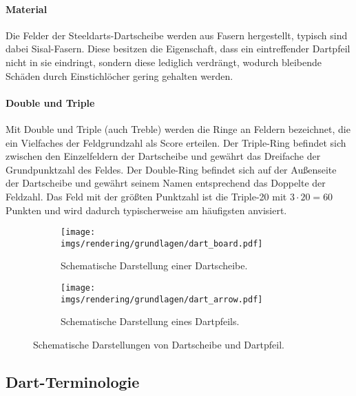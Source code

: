 \paragraph{Material}

Die Felder der Steeldarts-Dartscheibe werden aus Fasern hergestellt, typisch sind dabei Sisal-Fasern. Diese besitzen die Eigenschaft, dass ein eintreffender Dartpfeil nicht in sie eindringt, sondern diese lediglich verdrängt, wodurch bleibende Schäden durch Einstichlöcher gering gehalten werden.

\paragraph{Double und Triple}

Mit Double und Triple (auch Treble) werden die Ringe an Feldern bezeichnet, die ein Vielfaches der Feldgrundzahl als Score erteilen. Der Triple-Ring befindet sich zwischen den Einzelfeldern der Dartscheibe und gewährt das Dreifache der Grundpunktzahl des Feldes. Der Double-Ring befindet sich auf der Außenseite der Dartscheibe und gewährt seinem Namen entsprechend das Doppelte der Feldzahl. Das Feld mit der größten Punktzahl ist die Triple-20 mit $3 \cdot 20 = 60$ Punkten und wird dadurch typischerweise am häufigsten anvisiert.

\begin{figure}
    \begin{subfigure}{\textwidth}
        \centering
        \texttt{[image: imgs/rendering/grundlagen/dart\_board.pdf]}
        \caption{Schematische Darstellung einer Dartscheibe.}
        \label{img:dart_board}
    \end{subfigure}
    \par
    \vspace*{0.5cm}
    \begin{subfigure}{\textwidth}
        \centering
        \texttt{[image: imgs/rendering/grundlagen/dart\_arrow.pdf]}
        \caption{Schematische Darstellung eines Dartpfeils.}
        \label{img:dart_arrow}
    \end{subfigure}
    \caption{Schematische Darstellungen von Dartscheibe und Dartpfeil.}
    \label{img:dart_board_and_arrow}
\end{figure}



\subsection{Dart-Terminologie}
\label{sec:dart_terminologie}

